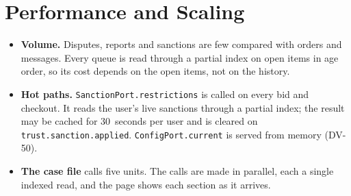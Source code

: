 \documentclass[11pt,a4paper]{article}
\begin{document}
\section{Performance and Scaling}
\begin{itemize}[nosep]
  \item \textbf{Volume.} Disputes, reports and sanctions are few compared with orders and messages. Every queue is read through a partial index on open items in age order, so its cost depends on the open items, not on the history.
  \item \textbf{Hot paths.} \texttt{SanctionPort.restrictions} is called on every bid and checkout. It reads the user's live sanctions through a partial index; the result may be cached for 30~seconds per user and is cleared on \texttt{trust.sanction.applied}. \texttt{ConfigPort.current} is served from memory (DV-50).
  \item \textbf{The case file} calls five units. The calls are made in parallel, each a single indexed read, and the page shows each section as it arrives.
\end{itemize}

\clearpage
\end{document}
